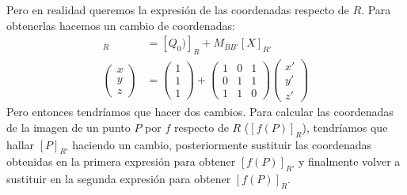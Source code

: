 \documentclass[14pt]{book}
\begin{document}
\begin{ej}
	Pero en realidad queremos la expresión de las coordenadas respecto de $R$. Para obtenerlas hacemos un cambio de coordenadas:
	\begin{align*}
		[X]_R &= [Q_0)]_R + M_{BB'} [X]_{R'} \\
		\left(\begin{array}{c}
		x \\ y \\ z
		\end{array}\right) &=
		\left(\begin{array}{c}
		1 \\ 1 \\ 1
		\end{array}\right) + 
		\left(\begin{array}{ccc}
		1 & 0 & 1 \\ 0 & 1 & 1 \\ 1 & 1 & 0
		\end{array}\right)
		\left(\begin{array}{c}
		x' \\ y' \\ z'
		\end{array}\right)
	\end{align*}
	Pero entonces tendríamos que hacer dos cambios. Para calcular las coordenadas de la imagen de un punto $P$ por $f$ respecto de $R$ ($[f(P)]_R$), tendríamos que hallar $[P]_{R'}$ haciendo un cambio, posteriormente sustituir las coordenadas obtenidas en la primera expresión para obtener $[f(P)]_{R'}$ y finalmente volver a sustituir en la segunda expresión para obtener $[f(P)]_R$.
	

\end{ej}
\end{document}
